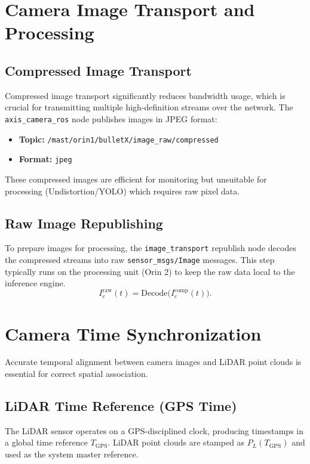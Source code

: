 \documentclass[12pt,a4paper]{report}
\begin{document}
\section{Camera Image Transport and Processing}
\subsection{Compressed Image Transport}
Compressed image transport significantly reduces bandwidth usage, which is crucial for transmitting multiple high-definition streams over the network. The \texttt{axis\_camera\_ros} node publishes images in JPEG format:
\begin{itemize}
    \item \textbf{Topic:} \texttt{/mast/orin1/bulletX/image\_raw/compressed}
    \item \textbf{Format:} \texttt{jpeg}
\end{itemize}
These compressed images are efficient for monitoring but unsuitable for processing (Undistortion/YOLO) which requires raw pixel data.

\subsection{Raw Image Republishing}
To prepare images for processing, the \texttt{image\_transport} republish node decodes the compressed streams into raw \texttt{sensor\_msgs/Image} messages. This step typically runs on the processing unit (Orin 2) to keep the raw data local to the inference engine.
\begin{equation}
I_c^{\mathrm{raw}}(t) = \mathrm{Decode}\bigl(I_c^{\mathrm{comp}}(t)\bigr).
\end{equation}

\section{Camera Time Synchronization}
Accurate temporal alignment between camera images and LiDAR point clouds is essential for correct spatial association.

\subsection{LiDAR Time Reference (GPS Time)}
The LiDAR sensor operates on a GPS-disciplined clock, producing timestamps in a global time reference $T_{\mathrm{GPS}}$. LiDAR point clouds are stamped as $P_L(T_{\mathrm{GPS}})$ and used as the system master reference.
\end{document}
